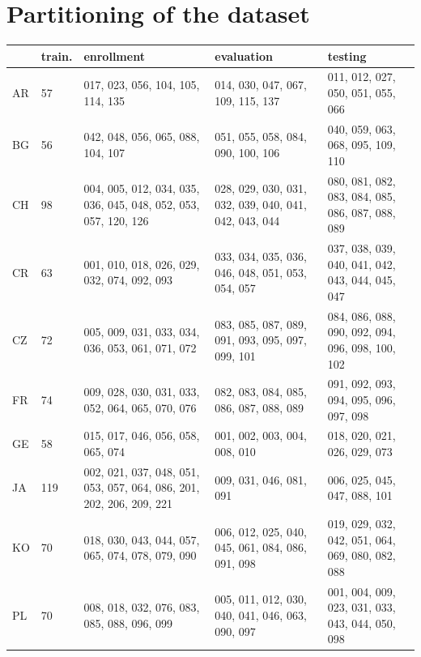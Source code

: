 \documentclass[bsc,frontabs,twoside,singlespacing,parskip,deptreport]{infthesis}
\begin{document}



\appendix

\chapter{Partitioning of the dataset}{
  \begin{sc}
    \centering
    \footnotesize
    \begin{longtable}{p{0.5cm}|p{0.8cm}|p{3.9cm}|p{3.5cm}|p{3.5cm}}
      & train. & enrollment & evaluation & testing \\
      \hline
      AR & 57 & 017, 023, 056, 104, 105, 114, 135 & 014, 030, 047, 067, 109, 115, 137 & 011, 012, 027, 050, 051, 055, 066 \\
      \hline
      BG & 56 & 042, 048, 056, 065, 088, 104, 107 & 051, 055, 058, 084, 090, 100, 106 & 040, 059, 063, 068, 095, 109, 110 \\
      \hline
      CH & 98 & 004, 005, 012, 034, 035, 036, 045, 048, 052, 053, 057, 120, 126 & 028, 029, 030, 031, 032, 039, 040, 041, 042, 043, 044 & 080, 081, 082, 083, 084, 085, 086, 087, 088, 089 \\
      \hline
      CR & 63 & 001, 010, 018, 026, 029, 032, 074, 092, 093 & 033, 034, 035, 036, 046, 048, 051, 053, 054, 057 & 037, 038, 039, 040, 041, 042, 043, 044, 045, 047 \\
      \hline
      CZ & 72 & 005, 009, 031, 033, 034, 036, 053, 061, 071, 072 & 083, 085, 087, 089, 091, 093, 095, 097, 099, 101 & 084, 086, 088, 090, 092, 094, 096, 098, 100, 102 \\
      \hline
      FR & 74 & 009, 028, 030, 031, 033, 052, 064, 065, 070, 076 & 082, 083, 084, 085, 086, 087, 088, 089 & 091, 092, 093, 094, 095, 096, 097, 098 \\
      \hline
      GE & 58 & 015, 017, 046, 056, 058, 065, 074 & 001, 002, 003, 004, 008, 010 & 018, 020, 021, 026, 029, 073 \\
      \hline
      JA & 119 & 002, 021, 037, 048, 051, 053, 057, 064, 086, 201, 202, 206, 209, 221 & 009, 031, 046, 081, 091 & 006, 025, 045, 047, 088, 101 \\
      \hline
      KO & 70 & 018, 030, 043, 044, 057, 065, 074, 078, 079, 090 & 006, 012, 025, 040, 045, 061, 084, 086, 091, 098 & 019, 029, 032, 042, 051, 064, 069, 080, 082, 088 \\
      \hline
      PL & 70 & 008, 018, 032, 076, 083, 085, 088, 096, 099 & 005, 011, 012, 030, 040, 041, 046, 063, 090, 097 & 001, 004, 009, 023, 031, 033, 043, 044, 050, 098 \\

\end{longtable}
\end{sc}}
\end{document}
